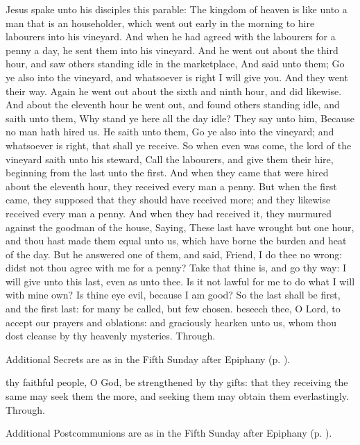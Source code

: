  Jesus spake unto his disciples this parable: The kingdom of heaven is like unto a man that is an householder, which went out early in the morning to hire labourers into his vineyard. And when he had agreed with the labourers for a penny a day, he sent them into his vineyard. And he went out about the third hour, and saw others standing idle in the marketplace, And said unto them; Go ye also into the vineyard, and whatsoever is right I will give you. And they went their way. Again he went out about the sixth and ninth hour, and did likewise. And about the eleventh hour he went out, and found others standing idle, and saith unto them, Why stand ye here all the day idle? They say unto him, Because no man hath hired us. He saith unto them, Go ye also into the vineyard; and whatsoever is right, that shall ye receive. So when even was come, the lord of the vineyard saith unto his steward, Call the labourers, and give them their hire, beginning from the last unto the first. And when they came that were hired about the eleventh hour, they received every man a penny. But when the first came, they supposed that they should have received more; and they likewise received every man a penny. And when they had received it, they murmured against the goodman of the house, Saying, These last have wrought but one hour, and thou hast made them equal unto us, which have borne the burden and heat of the day. But he answered one of them, and said, Friend, I do thee no wrong: didst not thou agree with me for a penny? Take that thine is, and go thy way: I will give unto this last, even as unto thee. Is it not lawful for me to do what I will with mine own? Is thine eye evil, because I am good? So the last shall be first, and the first last: for many be called, but few chosen.
\secret
{} beseech thee, O Lord, to accept our prayers and oblations: and graciously hearken unto us, whom thou dost cleanse by thy heavenly mysteries. Through.
\begin{rubric}
    Additional Secrets are as in the Fifth Sunday after Epiphany (p. \pageref{EpiphanyV}).
\end{rubric}
\postcommunion
{} thy faithful people, O God, be strengthened by thy gifts: that they receiving the same may seek them the more, and seeking them may obtain them everlastingly. Through.
\begin{rubric}
    Additional Postcommunions are as in the Fifth Sunday after Epiphany (p. \pageref{EpiphanyV}).
\end{rubric}

